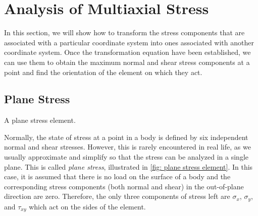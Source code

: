 \documentclass[
10pt,
a4paper,
openany,
svgnames,
]{kaobook} %
\begin{document}
\chapter{Analysis of Multiaxial Stress} \label{chapter: multiaxial stress}

In this section, we will show how to transform the stress components that are associated with a particular coordinate system into ones associated with another coordinate system. Once the transformation equation have been established, we can use them to obtain the maximum normal and shear stress components at a point and find the orientation of the element on which they act.

\section{Plane Stress}

\begin{marginfigure}
  \centering
  \caption{A plane stress element.}
  \label{fig: plane stress element}
\end{marginfigure}

Normally, the state of stress at a point in a body is defined by six independent normal and shear stresses. However, this is rarely encountered in real life, as we usually approximate and simplify so that the stress can be analyzed in a single plane. This is called \emph{plane stress}, illustrated in \cref{fig: plane stress element}. In this case, it is assumed that there is no load on the surface of a body and the corresponding stress components (both normal and shear) in the out-of-plane direction are zero. Therefore, the only three components of stress left are $\sigma_x$, $\sigma_y$, and $\tau_{xy}$ which act on the sides of the element.
\end{document}
